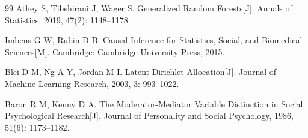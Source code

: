 \documentclass[12pt,a4paper,twoside]{ctexart}
\begin{document}
\begin{thebibliography}{99}
Athey S, Tibshirani J, Wager S. Generalized Random Forests[J]. Annals of Statistics, 2019, 47(2): 1148--1178.

Imbens G W, Rubin D B. Causal Inference for Statistics, Social, and Biomedical Sciences[M]. Cambridge: Cambridge University Press, 2015.

Blei D M, Ng A Y, Jordan M I. Latent Dirichlet Allocation[J]. Journal of Machine Learning Research, 2003, 3: 993--1022.

Baron R M, Kenny D A. The Moderator-Mediator Variable Distinction in Social Psychological Research[J]. Journal of Personality and Social Psychology, 1986, 51(6): 1173--1182.

\end{thebibliography}
\end{document}
